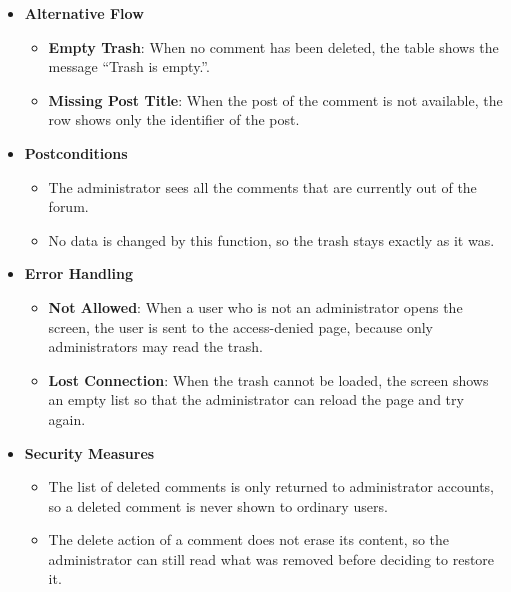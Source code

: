 \begin{itemize}[leftmargin=1.6em,topsep=4pt,itemsep=3pt,parsep=0pt,label=$\bullet$]
\begin{itemize}[leftmargin=2.2em,topsep=2pt,itemsep=3pt,parsep=0pt,label=$\circ$]
            \item \textbf{Choose a Comment}: The user opens a comment with the view button, or restores it with the restore button in the row (see \textbf{View Deleted Comment Detail} and \textbf{Restore Deleted Comment}).
        \end{itemize}
    \item \textbf{Alternative Flow}
        \begin{itemize}[leftmargin=2.2em,topsep=2pt,itemsep=3pt,parsep=0pt,label=$\circ$]
            \item \textbf{Empty Trash}: When no comment has been deleted, the table shows the message ``Trash is empty.''.
            \item \textbf{Missing Post Title}: When the post of the comment is not available, the row shows only the identifier of the post.
        \end{itemize}
    \item \textbf{Postconditions}
        \begin{itemize}[leftmargin=2.2em,topsep=2pt,itemsep=3pt,parsep=0pt,label=$\circ$]
            \item The administrator sees all the comments that are currently out of the forum.
            \item No data is changed by this function, so the trash stays exactly as it was.
        \end{itemize}
    \item \textbf{Error Handling}
        \begin{itemize}[leftmargin=2.2em,topsep=2pt,itemsep=3pt,parsep=0pt,label=$\circ$]
            \item \textbf{Not Allowed}: When a user who is not an administrator opens the screen, the user is sent to the access-denied page, because only administrators may read the trash.
            \item \textbf{Lost Connection}: When the trash cannot be loaded, the screen shows an empty list so that the administrator can reload the page and try again.
        \end{itemize}
    \item \textbf{Security Measures}
        \begin{itemize}[leftmargin=2.2em,topsep=2pt,itemsep=3pt,parsep=0pt,label=$\circ$]
            \item The list of deleted comments is only returned to administrator accounts, so a deleted comment is never shown to ordinary users.
            \item The delete action of a comment does not erase its content, so the administrator can still read what was removed before deciding to restore it.
        \end{itemize}
\end{itemize}

